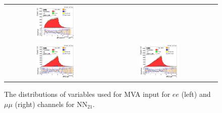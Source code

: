 \begin{figure}[ht]
\begin{center}
\begin{tabular}{ccc}
      \includegraphics[width=0.4\textwidth]{figures/tW/fig/MVA_input/mumu/H_2j1b_dR_l1_j2.png}\\
      \includegraphics[width=0.4\textwidth]{figures/tW/fig/MVA_input/ee/H_2j1b_dR_ll_j1.png}&
      \includegraphics[width=0.4\textwidth]{figures/tW/fig/MVA_input/mumu/H_2j1b_dR_ll_j1.png}\\
    \end{tabular}
    \caption{The distributions of variables used for MVA input for $ee$ (left) and $\mu\mu$ (right) channels for NN$_{21}$.
    \label{fig:MVA_2j1t_1}}
  \end{center}
\end{figure}

